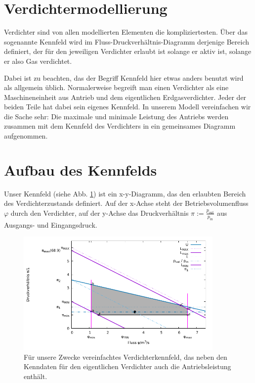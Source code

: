 \documentclass{article}
\begin{document}
\section*{Verdichtermodellierung}

Verdichter sind von allen modellierten Elementen die kompliziertesten. Über das sogenannte Kennfeld wird im Fluss-Druckverhältnis-Diagramm derjenige Bereich definiert, der für den jeweiligen Verdichter erlaubt ist solange er aktiv ist, solange er also Gas verdichtet.

Dabei ist zu beachten, das der Begriff Kennfeld hier etwas anders benutzt wird als allgemein üblich. Normalerweise begreift man einen Verdichter als eine Maschineneinheit aus Antrieb und dem eigentlichen Erdgasverdichter. Jeder der beiden Teile hat dabei sein eigenes Kennfeld. In unserem Modell vereinfachen wir die Sache sehr: Die maximale und minimale Leistung des Antriebs werden zusammen mit dem Kennfeld des Verdichters in ein gemeinsames Diagramm aufgenommen.

\section{Aufbau des Kennfelds}
Unser Kennfeld (siehe Abb. \ref{fig:kf}) ist ein x-y-Diagramm, das den erlaubten Bereich des Verdichterzustands definiert. Auf der x-Achse steht der Betriebsvolumenfluss $\varphi$ durch den Verdichter, auf der y-Achse das Druckverhältnis $\pi:=\frac{p_{\text{out}}}{p_{\text{in}}}$ aus Ausgangs- und Eingangsdruck.



\begin{figure}[!ht]
\includegraphics[width=0.9\textwidth]{Example_Compressor_Wheel_Map.pdf}
\caption{Für unsere Zwecke vereinfachtes Verdichterkennfeld, das neben den Kenndaten für den eigentlichen Verdichter auch die Antriebsleistung enthält.}
\label{fig:kf}
\end{figure}
\end{document}
